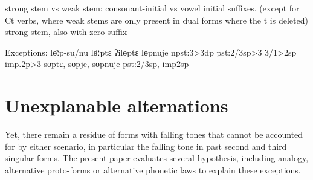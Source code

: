 \documentclass[oldfontcommands,oneside,a4paper,11pt]{article}
\begin{document}
strong stem vs weak stem: consonant-initial vs vowel initial suffixes. (except for Ct verbs, where weak stems are only present in dual forms where the t is deleted)
strong stem, also with zero suffix

Exceptions: lɵ̂ːp-su/nu lɵ̂ːptɛ ʔilɵptɛ lɵpnuje npst:3>3dp pst:2/3sp>3 3/1>2sp imp.2p>3
sɵptɛ, sɵpje, sɵpnuje pst:2/3sp, imp2sp

\section{Unexplanable alternations}
Yet, there remain a residue of forms with falling tones that cannot be accounted for by either scenario, in particular the falling tone in past second and third singular forms. The present paper evaluates several hypothesis, including analogy, alternative proto-forms or alternative phonetic laws to explain these exceptions.




\end{document}
